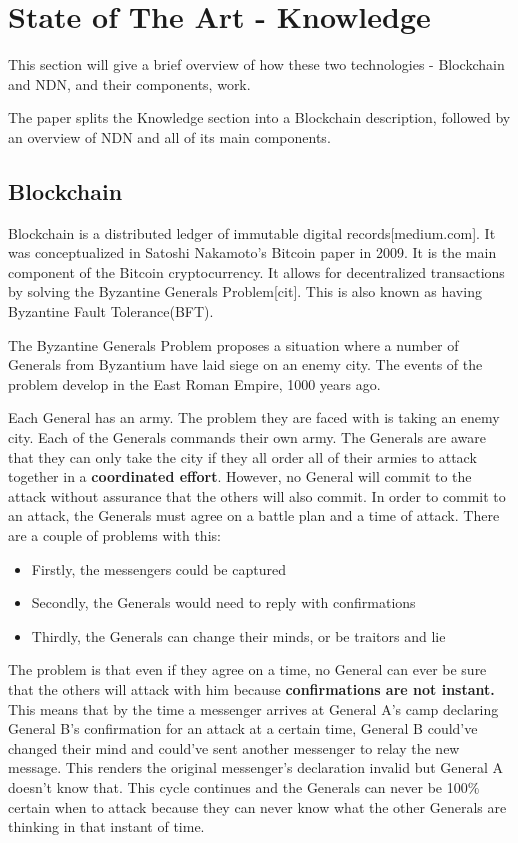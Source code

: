 \section{State of The Art - Knowledge}
This section will give a brief overview of how these two technologies - Blockchain and NDN, and their components, work.\par 
The paper splits the Knowledge section into a Blockchain description, followed by an overview of NDN and all of its main components.
\subsection{Blockchain}
Blockchain is a distributed ledger of immutable digital records[medium.com]. It was conceptualized in Satoshi Nakamoto's Bitcoin paper in 2009. It is the main component of the Bitcoin cryptocurrency. It allows for decentralized transactions by solving the Byzantine Generals Problem[cit]. This is also known as having Byzantine Fault Tolerance(BFT).\par 
The Byzantine Generals Problem proposes a situation where a number of Generals from Byzantium have laid siege on an enemy city. The events of the problem develop in the East Roman Empire, 1000 years ago. \par
Each General has an army. The problem they are faced with is taking an enemy city. Each of the Generals commands their own army. The Generals are aware that they can only take the city if they all order all of their armies to attack together in a \textbf{coordinated effort}. However, no General will commit to the attack without assurance that the others will also commit. In order to commit to an attack, the Generals must agree on a battle plan and a time of attack. There are a couple of problems with this:
\begin{itemize}
\item Firstly, the messengers could be captured
\item Secondly, the Generals would need to reply with confirmations
\item Thirdly, the Generals can change their minds, or be traitors and lie
\end{itemize}
The problem is that even if they agree on a time, no General can ever be sure that the others will attack with him because \textbf{confirmations are not instant.} This means that by the time a messenger arrives at General A's camp declaring General B's confirmation for an attack at a certain time, General B could've changed their mind and could've sent another messenger to relay the new message. This renders the original messenger's declaration invalid but General A doesn't know that. This cycle continues and the Generals can never be 100\% certain when to attack because they can never know what the other Generals are thinking in that instant of time.

